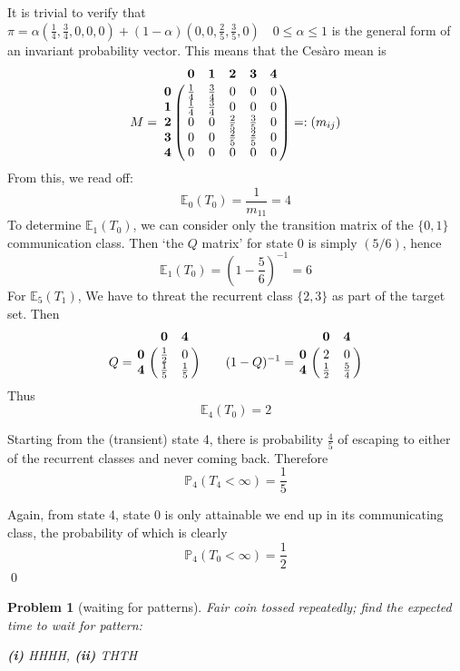 \documentclass[8pt,notitlepage,twocolumn]{report}
\newtheorem{problem}{Problem}
\newenvironment{solution}[1][Solution]{\begin{trivlist}
    \item[\hskip \labelsep {\bfseries #1}]}{\end{trivlist}}
\begin{document}
\begin{solution}
It is trivial to verify that 
$\pi = \alpha (\frac{1}{4},\frac{3}{4},0,0,0) + (1-\alpha)(0,0,\frac{2}{5},\frac{3}{5},0) 
	\quad 0\leq\alpha\leq1$ 
is the general form of an invariant probability vector.
This means that the Ces\`aro mean is
\begin{equation}
  M = \bordermatrix{
	& \mathbf{0} & \mathbf{1} & \mathbf{2} & \mathbf{3} & \mathbf{4} 	\cr
\mathbf{0} & \frac{1}{4} & \frac{3}{4} & 0 & 0 & 0		\cr
\mathbf{1} & \frac{1}{4} & \frac{3}{4} & 0 & 0 & 0		\cr
\mathbf{2} & 0 & 0 & \frac{2}{5} & \frac{3}{5} & 0		\cr
\mathbf{3} & 0 & 0 & \frac{2}{5} & \frac{2}{5} & 0		\cr
\mathbf{4} & 0 & 0 & 0 & 0 & 0
}
=: (m_{ij})
\end{equation}
From this, we read off:
$$
\mathbb{E}_0(T_0) = \frac{1}{m_{11}} = 4
$$
To determine $\mathbb{E}_1(T_0)$, we can consider only the transition matrix of the
$\{0,1\}$ communication class. Then `the $Q$ matrix' for state $0$ is simply $(5/6)$, 
hence
$$
\mathbb{E}_1(T_0) = (1-\frac{5}{6})^{-1} = 6
$$
For $\mathbb{E}_5(T_1)$, We have to threat the recurrent class $\{2,3\}$ as part of the target set.
Then 
\scriptsize
$$
Q = \bordermatrix{
	& \mathbf{0} & \mathbf{4}	\cr
\mathbf{0} & \frac{1}{2} & 0		\cr
\mathbf{4} & \frac{1}{5} & \frac{1}{5}
} \qquad
(1-Q)^{-1} = \bordermatrix{
	& \mathbf{0} & \mathbf{4}	\cr
\mathbf{0} & 2 & 0		\cr
\mathbf{4} & \frac{1}{2} & \frac{5}{4}
}	
$$
\normalsize
Thus $$ \mathbb{E}_4(T_0) = 2 $$

Starting from the (transient) state 4, there is probability $\frac{4}{5}$ 
of escaping to either of the recurrent classes and never coming back. Therefore
$$
	\mathbb{P}_4(T_4<\infty) = \frac{1}{5}
$$

Again, from state 4, state 0 is only attainable we end up in its communicating class, 
the probability of which is clearly
$$
	\mathbb{P}_4(T_0<\infty) = \frac{1}{2}
$$
\qed
\end{solution}

\begin{problem}[waiting for patterns]
Fair coin tossed repeatedly; find the expected time to wait for pattern:

{\bf (i)} {HHHH}, {\bf (ii)} {THTH}
\end{problem}
\end{document}

